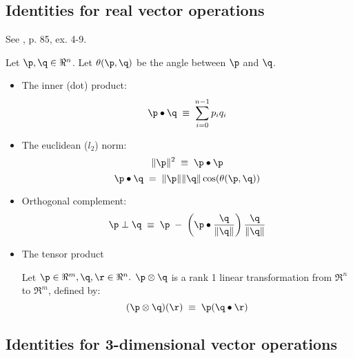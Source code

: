 \label{sec:general}



\subsection{Identities for real vector operations}
\label{sec:RX}

See \cite{spivak-1965}, p. 85, ex. 4-9.

Let $\p, \q \in \Re^{n}$.
Let $\theta(\p,\q)$ be the angle between $\p$ and $\q$.

\begin{itemize}
\item The inner (dot) product:
\begin{equation}
\p \bullet \q \; \equiv \; \sum_{i=0}^{n-1} p_i q_i
\end{equation}

\item The euclidean ($l_2$) norm:
\begin{equation}
\| \p \|^2 \; \equiv \; \p \bullet \p
\end{equation}
\begin{equation}
\p \bullet \q \; = \; \| \p \| \| \q \| \cos(\theta(\p,\q))
\end{equation}

\item Orthogonal complement:
\begin{equation}
\p \perp \q \; \equiv \; \p \; - \; \left( \p \bullet \frac{\q}{\|\q\|}\right) \frac{\q}{\|\q\|}
\end{equation}

\item The tensor product

Let $\p \in \Re^m, \q, \r \in \Re^n.$
$\p \otimes \q$ is a rank 1 linear transformation
from $\Re^n$ to $\Re^m$, defined by:
\begin{equation}
(\p \otimes \q)(\r) \; \equiv \; \p (\q \bullet \r)
\end{equation}

\end{itemize}


\subsection{Identities for 3-dimensional vector operations}
\label{sec:R3X}

